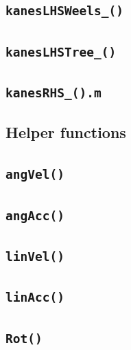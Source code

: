 \documentclass[a4paper,10pt]{article}
\begin{document}
\subsection{\texttt{kanesLHSWeels\_()}}


\subsection{\texttt{kanesLHSTree\_()}}

 
\subsection{\texttt{kanesRHS\_().m}}


\subsection{Helper functions}

\subsection{\texttt{angVel()}}

 
\subsection{\texttt{angAcc()}}


\subsection{\texttt{linVel()}}

 
\subsection{\texttt{linAcc()}}

 
\subsection{\texttt{Rot()}}

 
\end{document}

